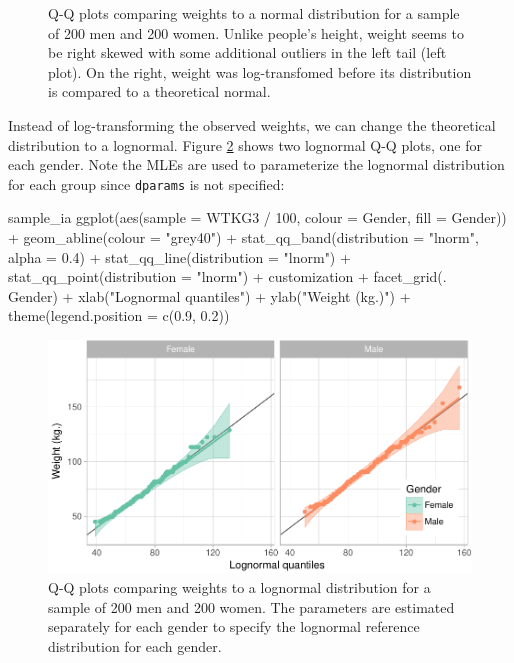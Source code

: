 \begin{Schunk}
\begin{figure}
{}

\caption[Q-Q plots comparing weights to a normal distribution for a sample of 200 men and 200 women]{Q-Q plots comparing weights to a normal distribution for a sample of 200 men and 200 women. Unlike people's height, weight seems to be right skewed with some additional outliers in the left tail (left plot). On the right, weight was log-transfomed before its distribution is compared to a theoretical normal. }\label{fig:weights}
\end{figure}
\end{Schunk}

Instead of log-transforming the observed weights, we can change the
theoretical distribution to a lognormal. Figure \ref{fig:weights-log}
shows two lognormal Q-Q plots, one for each gender. Note the MLEs are
used to parameterize the lognormal distribution for each group since
\texttt{dparams} is not specified:

\begin{Schunk}
\begin{Sinput}
sample_ia %
  ggplot(aes(sample = WTKG3 / 100, colour = Gender, fill = Gender)) +
  geom_abline(colour = "grey40") +
  stat_qq_band(distribution = "lnorm", alpha = 0.4) +
  stat_qq_line(distribution = "lnorm") +
  stat_qq_point(distribution = "lnorm") +
  customization +
  facet_grid(. ~ Gender) +
  xlab("Lognormal quantiles") +
  ylab("Weight (kg.)") +
  theme(legend.position = c(0.9, 0.2))
\end{Sinput}
\begin{figure}

{\centering \includegraphics[width=0.9\linewidth]{loy-figures/weights-log-1} 

}

\caption[Q-Q plots comparing weights to a lognormal distribution for a sample of 200 men and 200 women]{Q-Q plots comparing weights to a lognormal distribution for a sample of 200 men and 200 women. The parameters are estimated separately for each gender to specify the lognormal reference distribution for each gender.}\label{fig:weights-log}
\end{figure}
\end{Schunk}

